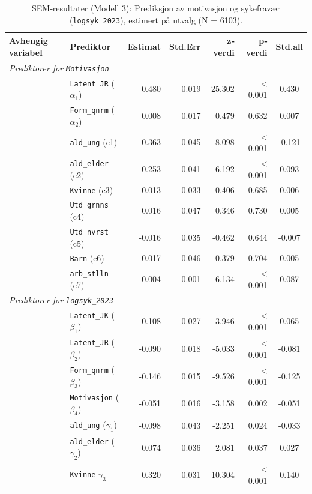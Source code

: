 \documentclass[
  12pt,
  a4paper,
  DIV=11,
  numbers=noendperiod]{scrartcl}
\begin{document}
\begin{table}[htbp]
\centering
\caption{SEM‐resultater (Modell 3): Prediksjon av motivasjon og sykefravær (\texttt{logsyk\_2023}), estimert på utvalg (N = 6103).}
\label{tab:sem_results_model3}
\begin{tabular}{@{}llrrrrc@{}}
\toprule
Avhengig variabel & Prediktor & Estimat & Std.Err & z‐verdi & p‐verdi & Std.all \\
\midrule
\multicolumn{7}{l}{\textit{Prediktorer for \texttt{Motivasjon}}} \\
& \texttt{Latent\_JR} ($\alpha_1$)        & 0.480 & 0.019 & 25.302 & < 0.001 & 0.430 \\
& \texttt{Form\_qnrm} ($\alpha_2$)        & 0.008 & 0.017 & 0.479  & 0.632   & 0.007 \\
& \texttt{ald\_ung} (c1)          & -0.363& 0.045 & -8.098 & < 0.001 & -0.121 \\
& \texttt{ald\_elder} (c2)        & 0.253 & 0.041 & 6.192  & < 0.001 & 0.093 \\
& \texttt{Kvinne} (c3)            & 0.013 & 0.033 & 0.406  & 0.685   & 0.006 \\
& \texttt{Utd\_grnns} (c4)        & 0.016 & 0.047 & 0.346  & 0.730   & 0.005 \\
& \texttt{Utd\_nvrst} (c5)        & -0.016& 0.035 & -0.462 & 0.644   & -0.007 \\
& \texttt{Barn} (c6)              & 0.017 & 0.046 & 0.379  & 0.704   & 0.005 \\
& \texttt{arb\_stlln} (c7)        & 0.004 & 0.001 & 6.134  & < 0.001 & 0.087 \\
\midrule
\multicolumn{7}{l}{\textit{Prediktorer for \texttt{logsyk\_2023}}} \\
& \texttt{Latent\_JK} ($\beta_1$)        & 0.108 & 0.027 & 3.946  & < 0.001 & 0.065 \\
& \texttt{Latent\_JR} ($\beta_2$)        & -0.090& 0.018 & -5.033 & < 0.001 & -0.081 \\
& \texttt{Form\_qnrm} ($\beta_3$)        & -0.146& 0.015 & -9.526 & < 0.001 & -0.125 \\
& \texttt{Motivasjon} ($\beta_4$)        & -0.051& 0.016 & -3.158 & 0.002   & -0.051 \\
& \texttt{ald\_ung} ($\gamma_1$)          & -0.098& 0.043 & -2.251 & 0.024   & -0.033 \\
& \texttt{ald\_elder} ($\gamma_2$)        & 0.074 & 0.036 & 2.081  & 0.037   & 0.027 \\
& \texttt{Kvinne} $\gamma_3$            & 0.320 & 0.031 & 10.304 & < 0.001 & 0.140 \\

\end{tabular}
\end{table}
\end{document}
